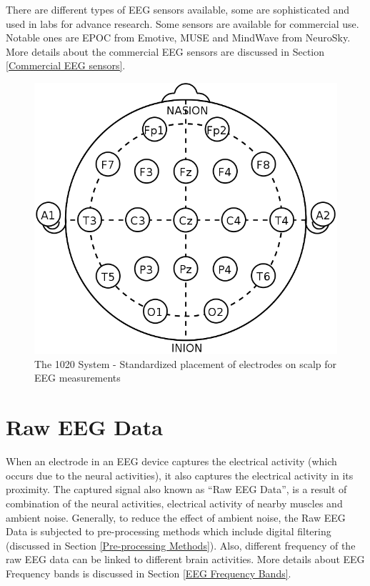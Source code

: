 	There are different types of EEG sensors available, some are sophisticated and used in labs for advance research. Some sensors are available for commercial use. Notable ones are EPOC from Emotive, MUSE and MindWave from NeuroSky. More details about the commercial EEG sensors are discussed in Section \ref{Commercial EEG sensors}.

  \begin{figure}[hbtp]
    \centering
    \includegraphics[width=1\textwidth]{Chapter-2/Standard}
    \caption{The 1020 System - Standardized placement of electrodes on scalp for EEG
    measurements \cite{system1020}}
    \label{fig:standard}
  \end{figure}

    \section{Raw EEG Data}
    	When an electrode in an EEG device captures the electrical activity (which occurs due to the neural activities), it also captures the electrical activity in its proximity. The captured signal also known as ``Raw EEG Data'', is a result of combination of the neural activities, electrical activity of nearby muscles and ambient noise. Generally, to reduce the effect of ambient noise, the Raw EEG Data is subjected to pre-processing methods which include digital filtering (discussed in Section \ref{Pre-processing Methods}). Also, different frequency of the raw EEG data can be linked to different brain activities. More details about EEG Frequency bands is discussed in Section \ref{EEG Frequency Bands}.
        
